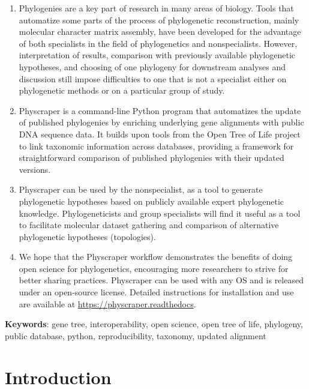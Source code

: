 \documentclass[]{article}
\begin{document}
\begin{enumerate}
\def\labelenumi{\arabic{enumi}.}
\item
  Phylogenies are a key part of research in many areas of biology. Tools that automatize
  some parts of the process of phylogenetic reconstruction, mainly molecular character matrix assembly,
  have been developed for the advantage of both specialists in the field of phylogenetics and nonspecialists.
  However, interpretation of results, comparison with previously available phylogenetic
  hypotheses, and choosing of one phylogeny for downstream analyses and discussion still impose difficulties
  to one that is not a specialist either on phylogenetic methods or on a particular group of study.
\item
  Physcraper is a command-line Python program that automatizes the update of published
  phylogenies by enriching underlying gene alignments with public DNA sequence data. It builds upon tools from the Open Tree of Life project to link taxonomic information across databases, providing a framework for straightforward comparison of published phylogenies with their updated versions.
\item
  Physcraper can be used by the nonspecialist, as a tool to generate phylogenetic
  hypotheses based on publicly available expert phylogenetic knowledge.
  Phylogeneticists and group specialists will find it useful as a tool to facilitate molecular dataset gathering and comparison
  of alternative phylogenetic hypotheses (topologies).
\item
  We hope that the Physcraper workflow demonstrates the benefits of doing open science for phylogenetics, encouraging more researchers to strive for better sharing practices. Physcraper can be used with any OS and is released under an open-source license. Detailed instructions for installation and
  use are available at \href{https://physcraper.readthedocs.io/en/tutorial/index.html}{https://physcraper.readthedocs}.
\end{enumerate}

\textbf{Keywords}: gene tree, interoperability, open science, open tree of life, phylogeny, public database, python, reproducibility, taxonomy, updated alignment

\newpage

\hypertarget{introduction}{%
\section{Introduction}\label{introduction}}
\end{document}
